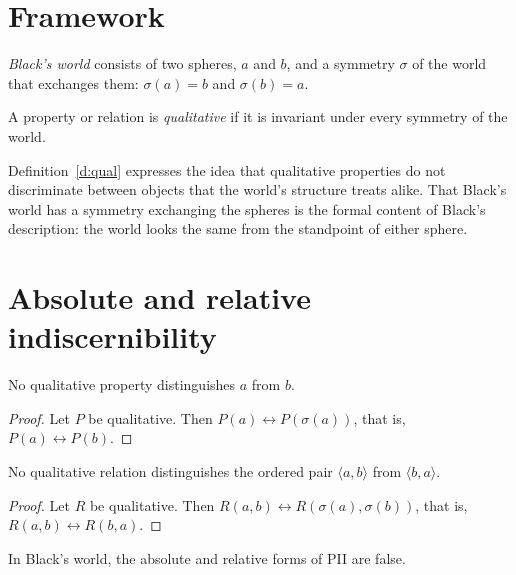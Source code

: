 \documentclass{situationist-preprint}
\begin{document}
\section{Framework}

\begin{definition}\label{d:world}
\emph{Black's world} consists of two spheres, $a$ and $b$, and a symmetry $\sigma$ of the world that exchanges them: $\sigma(a) = b$ and $\sigma(b) = a$.
\end{definition}

\begin{definition}\label{d:qual}
A property or relation is \emph{qualitative} if it is invariant under every symmetry of the world.
\end{definition}

Definition~\ref{d:qual} expresses the idea that qualitative properties do not discriminate between objects that the world's structure treats alike. That Black's world has a symmetry exchanging the spheres is the formal content of Black's description: the world looks the same from the standpoint of either sphere.

\section{Absolute and relative indiscernibility}

\begin{theorem}\label{t:abs}
No qualitative property distinguishes $a$ from $b$.
\end{theorem}

\begin{proof}
Let $P$ be qualitative. Then $P(a) \leftrightarrow P(\sigma(a))$, that is, $P(a) \leftrightarrow P(b)$.
\end{proof}

\begin{theorem}\label{t:rel}
No qualitative relation distinguishes the ordered pair $\langle a, b\rangle$ from $\langle b, a\rangle$.
\end{theorem}

\begin{proof}
Let $R$ be qualitative. Then $R(a,b) \leftrightarrow R(\sigma(a),\sigma(b))$, that is, $R(a,b) \leftrightarrow R(b,a)$.
\end{proof}

\begin{corollary}\label{c:pii}
In Black's world, the absolute and relative forms of PII are false.
\end{corollary}
\end{document}
